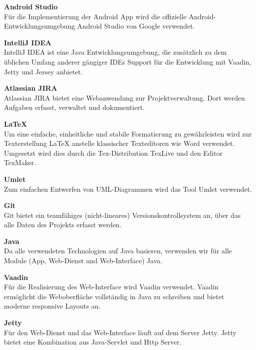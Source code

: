 \begin{description}
\item \textbf{\gls{Android} Studio} \hfill \\
Für die Implementierung der \gls{Android} \gls{App} wird die offizielle \gls{Android}-Entwicklungsumgebung \gls{Android} Studio von Google verwendet.

\item \textbf{IntelliJ IDEA} \hfill \\
IntelliJ IDEA ist eine Java Entwicklungsumgebung, die zusätzlich zu dem üblichen Umfang anderer gängiger \glspl{IDE} Support für die Entwicklung mit Vaadin, Jetty und Jersey anbietet.

\item \textbf{Atlassian JIRA} \hfill \\
Atlassian JIRA bietet eine Webanwendung zur Projektverwaltung. Dort werden Aufgaben erfasst, verwaltet und dokumentiert.

\item \textbf{LaTeX} \hfill \\
Um eine einfache, einheitliche und stabile Formatierung zu gewährleisten wird zur Texterstellung LaTeX  anstelle klassischer Texteditoren wie Word verwendet. Umgesetzt wird dies durch die Tex-Distribution TexLive und den Editor TexMaker.

\item \textbf{Umlet} \hfill \\
Zum einfachen Entwerfen von UML-Diagrammen wird das Tool Umlet verwendet.

\item \textbf{Git} \hfill \\
Git bietet ein teamfähiges (nicht-lineares) Versionskontrollsystem an, über das alle Daten des Projekts erfasst werden.

\item \textbf{Java} \hfill \\
Da alle verwendeten Technologien auf Java basieren, verwenden wir für alle Module (\gls{App}, \gls{Web-Dienst} und \gls{Web-Interface}) Java.

\item \textbf{Vaadin} \hfill \\
Für die Realisierung des \gls{Web-Interface} wird Vaadin verwendet. Vaadin ermöglicht die Weboberfläche vollständig in Java zu schreiben und bietet moderne responsive Layouts an.

\item \textbf{Jetty} \hfill \\
Für den \gls{Web-Dienst} und das \gls{Web-Interface} läuft auf dem Server Jetty. Jetty bietet eine Kombination aus \gls{Java-Servlet} und Http Server.


\end{description}
